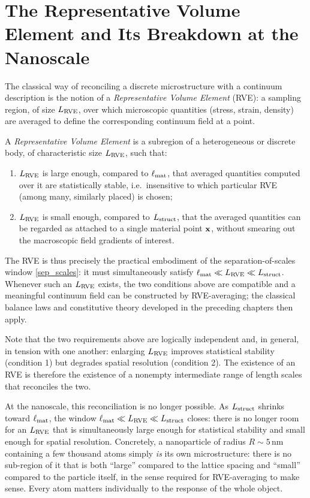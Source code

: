 \section{The Representative Volume Element and Its Breakdown at the Nanoscale}

The classical way of reconciling a discrete microstructure with a continuum description is the notion of a \textit{Representative Volume Element} (RVE): a sampling region, of size $L_{\rm RVE}$, over which microscopic quantities (stress, strain, density) are averaged to define the corresponding continuum field at a point.

\begin{definition}
	A \textit{Representative Volume Element} is a subregion of a heterogeneous or discrete body, of characteristic size $L_{\rm RVE}$, such that:
	\begin{enumerate}
		\item $L_{\rm RVE}$ is large enough, compared to $\ell_{\rm mat}$, that averaged quantities computed over it are statistically stable, i.e.\ insensitive to which particular RVE (among many, similarly placed) is chosen;
		\item $L_{\rm RVE}$ is small enough, compared to $L_{\rm struct}$, that the averaged quantities can be regarded as attached to a single material point $\mathbf{x}$, without smearing out the macroscopic field gradients of interest.
	\end{enumerate}
\end{definition}

The RVE is thus precisely the practical embodiment of the separation-of-scales window \eqref{sep_scales}: it must simultaneously satisfy $\ell_{\rm mat}\ll L_{\rm RVE}\ll L_{\rm struct}$. Whenever such an $L_{\rm RVE}$ exists, the two conditions above are compatible and a meaningful continuum field can be constructed by RVE-averaging; the classical balance laws and constitutive theory developed in the preceding chapters then apply.

\begin{remark}
	Note that the two requirements above are logically independent and, in general, in tension with one another: enlarging $L_{\rm RVE}$ improves statistical stability (condition 1) but degrades spatial resolution (condition 2). The existence of an RVE is therefore the existence of a nonempty intermediate range of length scales that reconciles the two.
\end{remark}

At the nanoscale, this reconciliation is no longer possible. As $L_{\rm struct}$ shrinks toward $\ell_{\rm mat}$, the window $\ell_{\rm mat}\ll L_{\rm RVE}\ll L_{\rm struct}$ closes: there is no longer room for an $L_{\rm RVE}$ that is simultaneously large enough for statistical stability and small enough for spatial resolution. Concretely, a nanoparticle of radius $R\sim 5\,\mathrm{nm}$ containing a few thousand atoms simply \textit{is} its own microstructure: there is no sub-region of it that is both ``large'' compared to the lattice spacing and ``small'' compared to the particle itself, in the sense required for RVE-averaging to make sense. Every atom matters individually to the response of the whole object.

